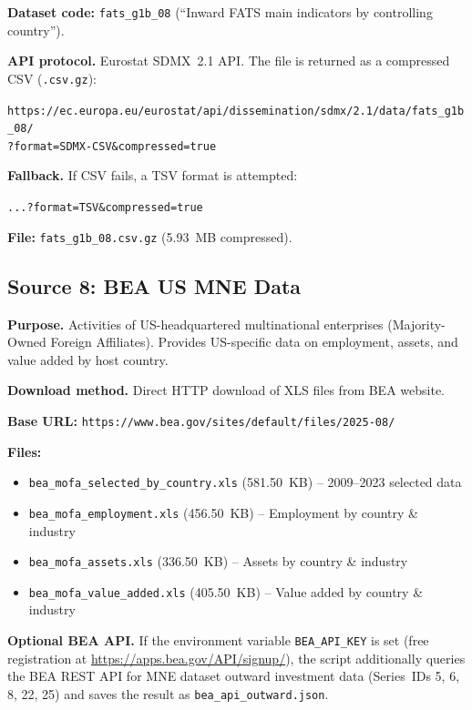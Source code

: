 \documentclass[12pt,a4paper]{article}
\begin{document}
\textbf{Dataset code:} \texttt{fats\_g1b\_08} (``Inward FATS main indicators by controlling country'').

\textbf{API protocol.}
Eurostat SDMX~2.1 API.
The file is returned as a compressed CSV (\texttt{.csv.gz}):
\begin{center}
\small\texttt{https://ec.europa.eu/eurostat/api/dissemination/sdmx/2.1/data/fats\_g1b\_08/\\?format=SDMX-CSV\&compressed=true}
\end{center}

\textbf{Fallback.}
If CSV fails, a TSV format is attempted:
\begin{center}
\small\texttt{...?format=TSV\&compressed=true}
\end{center}

\textbf{File:} \texttt{fats\_g1b\_08.csv.gz} (5.93~MB compressed).


\subsection{Source 8: BEA US MNE Data}\label{sec:src_bea}

\textbf{Purpose.}
Activities of US-headquartered multinational enterprises (Majority-Owned Foreign Affiliates).
Provides US-specific data on employment, assets, and value added by host country.

\textbf{Download method.}
Direct HTTP download of XLS files from BEA website.

\textbf{Base URL:} \texttt{https://www.bea.gov/sites/default/files/2025-08/}

\textbf{Files:}
\begin{itemize}[nosep]
    \item \texttt{bea\_mofa\_selected\_by\_country.xls} (581.50~KB) -- 2009--2023 selected data
    \item \texttt{bea\_mofa\_employment.xls} (456.50~KB) -- Employment by country \& industry
    \item \texttt{bea\_mofa\_assets.xls} (336.50~KB) -- Assets by country \& industry
    \item \texttt{bea\_mofa\_value\_added.xls} (405.50~KB) -- Value added by country \& industry
\end{itemize}

\textbf{Optional BEA API.}
If the environment variable \texttt{BEA\_API\_KEY} is set (free registration at \url{https://apps.bea.gov/API/signup/}), the script additionally queries the BEA REST API for MNE dataset outward investment data (Series~IDs 5, 6, 8, 22, 25) and saves the result as \texttt{bea\_api\_outward.json}.
\end{document}
